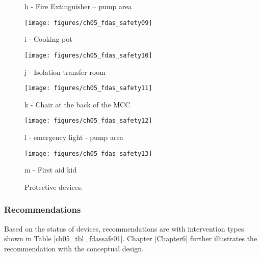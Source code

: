 \begin{figure}[!htb]
\begin{minipage}[b]{0.22\linewidth}
	\caption*{h - Fire Extinguisher – pump area}
\end{minipage}
	\hspace{0.03cm}
\begin{minipage}[b]{0.22\linewidth}
	\centering
	\texttt{[image: figures/ch05\_fdas\_safety09]}
	\caption*{i - Cooking pot}
\end{minipage}
	\hspace{0.03cm}
\begin{minipage}[b]{0.22\linewidth}
	\centering
	\texttt{[image: figures/ch05\_fdas\_safety10]}
	\caption*{j - Isolation transfer room}
\end{minipage}
	\hspace{0.03cm}
\begin{minipage}[b]{0.22\linewidth}
	\centering
	\texttt{[image: figures/ch05\_fdas\_safety11]}
	\caption*{k - Chair at the back of the MCC}
\end{minipage}
	\hspace{0.03cm}
\begin{minipage}[b]{0.22\linewidth}
	\centering
	\texttt{[image: figures/ch05\_fdas\_safety12]}
	\caption*{l - emergency light - pump area}
\end{minipage}

	\hspace{0.03cm}
\begin{minipage}[b]{0.22\linewidth}
	\centering
	\texttt{[image: figures/ch05\_fdas\_safety13]}
	\caption*{m - First aid kid}
\end{minipage}

	\caption{Protective devices.}
	\label{ch05_fig_fdassafety01}
\end{figure}

\subsubsection{Recommendations}
Based on the status of devices, recommendations are with intervention types shown in Table \ref{ch05_tbl_fdassafe01}. Chapter \ref{Chapter6} further illustrates the recommendation with the conceptual design.
